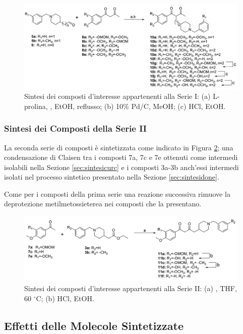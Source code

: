 \documentclass[a4paper, 12pt]{article}
\begin{document}
\begin{figure}[H]
	\centering
	\includegraphics[width=\linewidth]{immagini/condserie1_curcdone.png}
	\caption{Sintesi dei composti d'interesse appartenenti alla Serie I: (a) L-prolina,  , EtOH, reflusso; (b) 10\% Pd/C, MeOH; (c) HCl, EtOH.}
	\label{fig:condserie1_curcdone}
\end{figure}

\subsubsection{Sintesi dei Composti della Serie II}
\label{sec:condserie2}
La seconda serie di composti è sintetizzata come indicato in Figura \ref{fig:condserie2_curcdone}; una condensazione di Claisen tra i composti 7a, 7c e 7e ottenuti come intermedi isolabili nella Sezione \ref{sec:sintesicurc} e i composti 3a-3b anch'essi intermedi isolati nel processo sintetico presentato nella Sezione \ref{sec:sintesidone}.

Come per i composti della prima serie una reazione successiva rimuove la deprotezione metilmetossieterea nei composti che la presentano.

\begin{figure}[H]
	\centering
	\includegraphics[width=\linewidth]{immagini/condserie2_curcdone.png}
	\caption{Sintesi dei composti d'interesse appartenenti alla Serie II: (a)  , THF, 60 $^\circ$C; (b) HCl, EtOH.}
	\label{fig:condserie2_curcdone}
\end{figure}

\subsection{Effetti delle Molecole Sintetizzate}
\end{document}
